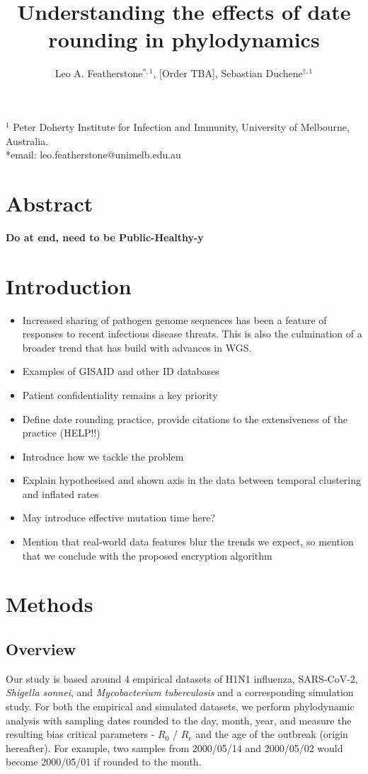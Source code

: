 \documentclass{article}
\title{Understanding the effects of date rounding in phylodynamics}
\author{Leo A. Featherstone$^{\ast,1}$, [Order TBA], Sebastian Duchene$^{\dagger,1}$}
\begin{document}
\maketitle
\linenumbers
$^{1}$ Peter Doherty Institute for Infection and Immunity, University of Melbourne, Australia.\\
*email: leo.featherstone@unimelb.edu.au

\section*{Abstract}
\textbf{Do at end, need to be Public-Healthy-y}

\begin{spacing}{1.5}
\section*{Introduction}
\begin{itemize}
    \item Increased sharing of pathogen genome sequences has been a feature of responses to recent infectious disease threats. This is also the culmination of a broader trend that has build with advances in WGS. 
    \item Examples of GISAID and other ID databases
    \item Patient confidentiality remains a key priority 
    \item Define date rounding practice, provide citations to the extensiveness of the practice (HELP!!)
    \item Introduce how we tackle the problem
    \item Explain hypothesised and shown axis in the data between temporal clustering and inflated rates
    \item May introduce effective mutation time here?
    \item Mention that real-world data features blur the trends we expect, so mention that we conclude with the proposed encryption algorithm
\end{itemize}



\section*{Methods}
\subsection*{Overview}
Our study is based around 4 empirical datasets of H1N1 influenza, SARS-CoV-2, \textit{Shigella sonnei}, and \textit{Mycobacterium tuberculosis} and a corresponding simulation study. For both the empirical and simulated datasets, we perform phylodynamic analysis with sampling dates rounded to the day, month, year, and measure the resulting bias critical parameters - $R_0$ / $R_e$ and the age of the outbreak (origin hereafter). For example, two samples from 2000/05/14 and 2000/05/02 would become 2000/05/01 if rounded to the month.


\end{spacing}
\end{document}
